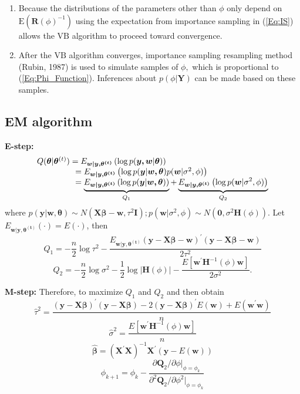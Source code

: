 \documentclass[
]{article}
\begin{document}
\begin{enumerate}
\def\labelenumi{(\arabic{enumi})}
\item
  Because the distributions of the parameters other than \(\phi\) only
  depend on \(\mathrm{E}\left(\mathbf{R}(\phi)^{-1}\right)\) using the
  expectation from importance sampling in (\ref{Eq:IS}) allows the
  \(\mathrm{VB}\) algorithm to proceed toward convergence.
\item
  After the \(\mathrm{VB}\) algorithm converges, importance sampling
  resampling method (Rubin, 1987) is used to simulate samples of
  \(\phi,\) which is proportional to (\ref{Eq:Phi_Function}). Inferences
  about \(p(\phi | \mathbf{Y})\) can be made based on these samples.
\end{enumerate}

\hypertarget{em-algorithm}{%
\subsection{EM algorithm}\label{em-algorithm}}

\textbf{E-step:} \[\begin{array}{l}
    Q(\bm{\theta}|\bm{\theta}^{(t)})=E_{\bm{w|y,\theta^{(t)}}}\left(\log p(\bm{y,w}|\bm{\theta})\right)\\
    {\kern 44pt}=E_{\bm{w|y,\theta^{(t)}}}\left(\log p(\bm{y}|\bm{w,\theta})p(\bm{w}|\sigma^2,\phi) \right)\\
    {\kern 44pt}=\underbrace{E_{\bm{w|y,\theta^{(t)}}}\left(\log   
     p(\bm{y}|\bm{w,\theta})\right)}_{Q_1}+\underbrace{E_{\bm{w|y,\theta^{(t)}}}\left(\log 
    p(\bm{w}|\sigma^2,\phi)\right)}_{Q_2}
  \end{array}\] where
\(p(\bm{y}|\bm{w,\theta})\sim N(\bm{X\beta-w},\tau^2\bm{I});p(\bm{w}|\sigma^2,\phi)\sim N(\bm{0},\sigma^2\bm{H}(\phi)).\)
Let \(E_{\bm{w|y,\theta^{(t)}}}(\cdot)=E(\cdot)\), then
\[Q_1=-\frac{n}{2}\log \tau^2-\frac{E_{\bm{w|y,\theta^{(t)}}}(\bm{y} - \bm{X\beta} - \bm{w})^\prime(\bm{y} - \bm{X\beta} - \bm{w})} {2\tau^2}\]
\[Q_2=-\frac{n}{2}\log \sigma^2-\frac{1}{2}\log |\bm{H}(\phi)|-\frac{E[\bm{w^\prime}\bm{H}^{-1}(\phi)\bm{w}]}{2\sigma^2}.\]

\textbf{M-step:} Therefore, to maximize \(Q_1\) and \(Q_2\) and then
obtain \begin{equation}
     \hat{\tau}^2=\frac{(\bm{y} - \bm{X\beta})^\prime(\bm{y} - \bm{X\beta})-2(\bm{y} - \bm{X\beta})^\prime     
                  E(\bm{w}) + E(\bm{w^\prime w})}{n}
  \end{equation} \begin{equation}
    \hat{\sigma}^2=\frac{E[\bm{w^\prime}\bm{H}^{-1}(\phi)\bm{w}]}{n}
  \end{equation} \begin{equation}
     \hat{\bm{\beta}}=(\bm{X}^\prime \bm{X})^{- 1}\bm{X}^\prime (\bm{y} - E(\bm{w}))
  \end{equation} \begin{equation}
  \phi_{k + 1} = \phi_{k} - \frac{\partial \bm{Q}_2/\partial \phi |_{\phi =  \phi_k}}{\partial^2 \bm{Q}_2/\partial \phi^2 |_{\phi = \phi_k}}
\end{equation}
\end{document}
